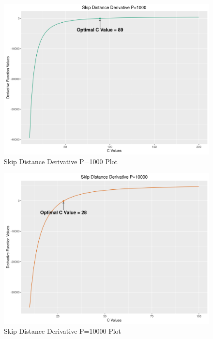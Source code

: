 \documentclass[11pt]{article}
\newenvironment{code}{\captionsetup{type=listing}}{}
\begin{document}
\begin{figure}[h]
\includegraphics[width=\columnwidth]{code/skipDistanceD.png}
\caption{Skip Distance Derivative P=1000 Plot}
\label{fig:skdp}
\end{figure}
\begin{figure}[h]
\includegraphics[width=\columnwidth]{code/skipDistanceD2.png}
\caption{Skip Distance Derivative P=10000 Plot}
\label{fig:skdp2}
\end{figure}
\newpage
\clearpage
\begin{code}
	 \label{code:dsd}
\end{code}
\begin{code}
	 \label{code:skip}
\end{code}
\newpage
\begin{code}
	 \label{code:util}
\end{code}
\end{document}
